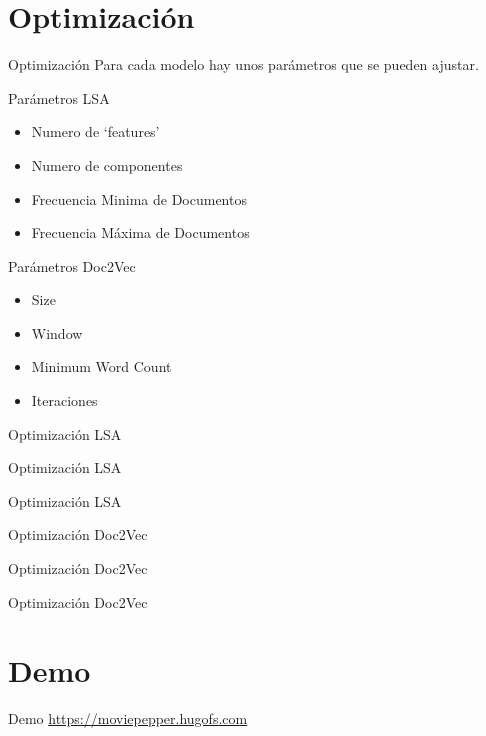 \documentclass{beamer}
\begin{document}
  \section{Optimización}
  \begin{frame}{Optimización}
      Para cada modelo hay unos parámetros que se pueden ajustar.
  \end{frame}
  \begin{frame}{Parámetros LSA}
      \begin{itemize}
          \item Numero de `features'
          \item Numero de componentes
          \item Frecuencia Minima de Documentos
          \item Frecuencia Máxima de Documentos
      \end{itemize}
  \end{frame}
  \begin{frame}{Parámetros Doc2Vec}
      \begin{itemize}
          \item Size
          \item Window
          \item Minimum Word Count
          \item Iteraciones
      \end{itemize}
  \end{frame}
\newlength\figureheight
\newlength\figurewidth
\setlength{}
\setlength\figurewidth{\linewidth}
  \begin{frame}{Optimización LSA}
      \tiny
      \centering
      
  \end{frame}
  \begin{frame}{Optimización LSA}
      \tiny
      \centering
      
  \end{frame}
  \begin{frame}{Optimización LSA}
      \tiny
      \centering
      
  \end{frame}
  \begin{frame}{Optimización Doc2Vec}
      \tiny
      \centering
      
  \end{frame}
  \begin{frame}{Optimización Doc2Vec}
      \tiny
      \centering
      
  \end{frame}
  \begin{frame}{Optimización Doc2Vec}
      \tiny
      \centering
      
  \end{frame}
  \section{Demo}
  \begin{frame}{Demo}
      \url{https://moviepepper.hugofs.com}
  \end{frame}
\end{document}
